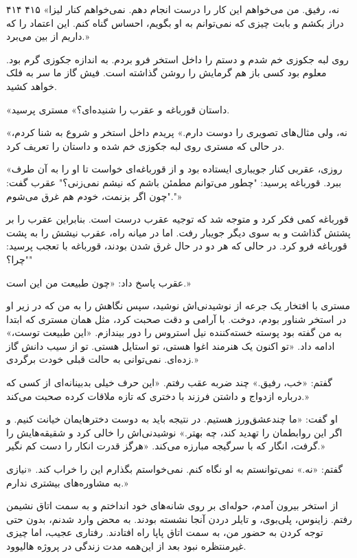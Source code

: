 ۴۱۴ ۴۱۵  
«نه، رفیق. من می‌خواهم این کار را درست انجام دهم. نمی‌خواهم کنار لیزا دراز بکشم و بابت چیزی که نمی‌توانم به او بگویم، احساس گناه کنم. این اعتماد را که داریم از بین می‌برد.»

روی لبه جکوزی خم شدم و دستم را داخل استخر فرو بردم. به اندازه جکوزی گرم بود. معلوم بود کسی باز هم گرمایش را روشن گذاشته است. فیش گاز ما سر به فلک خواهد کشید.

«داستان قورباغه و عقرب را شنیده‌ای؟» مستری پرسید.

«نه، ولی مثال‌های تصویری را دوست دارم.» پریدم داخل استخر و شروع به شنا کردم، در حالی که مستری روی لبه جکوزی خم شده و داستان را تعریف کرد.

«روزی، عقربی کنار جویباری ایستاده بود و از قورباغه‌ای خواست تا او را به آن طرف ببرد. قورباغه پرسید: "چطور می‌توانم مطمئن باشم که نیشم نمی‌زنی؟" عقرب گفت: "چون اگر بزنمت، خودم هم غرق می‌شوم."»

قورباغه کمی فکر کرد و متوجه شد که توجیه عقرب درست است. بنابراین عقرب را بر پشتش گذاشت و به سوی دیگر جویبار رفت. اما در میانه راه، عقرب نیشش را به پشت قورباغه فرو کرد. در حالی که هر دو در حال غرق شدن بودند، قورباغه با تعجب پرسید: "چرا؟"

عقرب پاسخ داد: «چون طبیعت من این است.»

مستری با افتخار یک جرعه از نوشیدنی‌اش نوشید، سپس نگاهش را به من که در زیر او در استخر شناور بودم، دوخت. با آرامی و دقت صحبت کرد، مثل همان مستری که ابتدا به من گفته بود پوسته خسته‌کننده نیل استروس را دور بیندازم. «این طبیعت توست،» ادامه داد. «تو اکنون یک هنرمند اغوا هستی، تو استایل هستی. تو از سیب دانش گاز زده‌ای. نمی‌توانی به حالت قبلی خودت برگردی.»

گفتم: «خب، رفیق.» چند ضربه عقب رفتم. «این حرف خیلی بدبینانه‌ای از کسی که درباره ازدواج و داشتن فرزند با دختری که تازه ملاقات کرده صحبت می‌کند.»

او گفت: «ما چندعشق‌ورز هستیم. در نتیجه باید به دوست دخترهایمان خیانت کنیم. و اگر این روابطمان را تهدید کند، چه بهتر.» نوشیدنی‌اش را خالی کرد و شقیقه‌هایش را گرفت، انگار که با سرگیجه مبارزه می‌کند. «هرگز قدرت انکار را دست کم نگیر.»

گفتم: «نه.» نمی‌توانستم به او نگاه کنم. نمی‌خواستم بگذارم این را خراب کند. «نیازی به مشاوره‌های بیشتری ندارم.»

از استخر بیرون آمدم، حوله‌ای بر روی شانه‌های خود انداختم و به سمت اتاق نشیمن رفتم. زاینوس، پلی‌بوی، و تایلر دردن آنجا نشسته بودند. به محض وارد شدنم، بدون حتی توجه کردن به حضور من، به سمت اتاق پاپا راه افتادند. رفتاری عجیب، اما چیزی غیرمنتظره نبود بعد از این‌همه مدت زندگی در پروژه هالیوود.